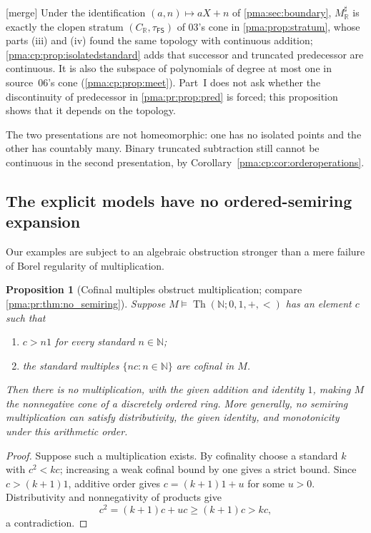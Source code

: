 \documentclass[11pt]{article}
\numberwithin{equation}{section}
\newtheorem{proposition}[proposition]{Proposition}
\theoremstyle{definition}
\theoremstyle{remark}
\newcommand{\N}{\mathbb N}
\newcommand{\R}{\mathbb R}
\newcommand{\Th}{\operatorname{Th}}
\newcommand{\FS}{\mathsf{FS}}
\newcommand{\mergetag}{\textup{\textsf{\small[merge]}}}
\begin{document}
\noindent\mergetag{} Under the identification $(a,n)\mapsto aX+n$ of
\cref{pma:sec:boundary}, $M_{\R}^{\sharp}$ is exactly the clopen stratum
$(C_{\R},\tau_{\FS})$ of 03's cone in \cref{pma:prop:stratum}, whose parts
(iii) and (iv) found the same topology with continuous addition;
\cref{pma:cp:prop:isolatedstandard} adds that successor and truncated
predecessor are continuous. It is also the subspace of polynomials of degree
at most one in source~06's cone (\cref{pma:cp:prop:meet}). Part~I does not
ask whether the discontinuity of predecessor in \cref{pma:pr:prop:pred} is
forced; this proposition shows that it depends on the topology.

The two presentations are not homeomorphic: one has no isolated points
and the other has countably many. Binary truncated subtraction still
cannot be continuous in the second presentation, by
Corollary~\ref{pma:cp:cor:orderoperations}.

\subsection{The explicit models have no ordered-semiring expansion}

Our examples are subject to an algebraic obstruction stronger than a
mere failure of Borel regularity of multiplication.

\begin{proposition}[Cofinal multiples obstruct multiplication; compare \cref{pma:pr:thm:no_semiring}]
\label{pma:cp:prop:nomultiplication}
Suppose $M\models\Th(\N;0,1,+,<)$ has an element $c$ such that
\begin{enumerate}[label=(\roman*)]
\item $c>n1$ for every standard $n\in\N$;
\item the standard multiples $\{nc:n\in\N\}$ are cofinal in $M$.
\end{enumerate}
Then there is no multiplication, with the given addition and identity
$1$, making $M$ the nonnegative cone of a discretely ordered ring.
More generally, no semiring multiplication can satisfy distributivity,
the given identity, and monotonicity under this arithmetic order.
\end{proposition}

\begin{proof}
Suppose such a multiplication exists. By cofinality choose a standard
$k$ with $c^2<kc$; increasing a weak cofinal bound by one gives a strict
bound. Since $c>(k+1)1$, additive order gives
$c=(k+1)1+u$ for some $u>0$. Distributivity and nonnegativity of products
give
\[
c^2=(k+1)c+uc\geq(k+1)c>kc,
\]
a contradiction.
\end{proof}
\end{document}
